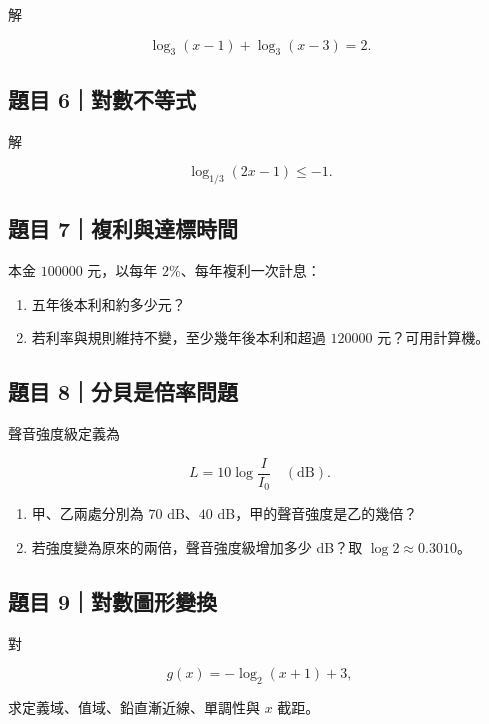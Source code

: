 \documentclass[11pt,a4paper]{article}
\providecommand{\tightlist}{%
  \setlength{\itemsep}{0pt}\setlength{\parskip}{0pt}}
\begin{document}
解

\[
\log_3(x-1)+\log_3(x-3)=2.
\]

\subsection{題目 6｜對數不等式}\label{ux984cux76ee-6ux5c0dux6578ux4e0dux7b49ux5f0f}

解

\[
\log_{1/3}(2x-1)\le-1.
\]

\subsection{題目 7｜複利與達標時間}\label{ux984cux76ee-7ux8907ux5229ux8207ux9054ux6a19ux6642ux9593}

本金 \(100000\) 元，以每年 \(2\%\)、每年複利一次計息：

\begin{enumerate}
\def\labelenumi{\arabic{enumi}.}
\tightlist
\item
  五年後本利和約多少元？
\item
  若利率與規則維持不變，至少幾年後本利和超過 \(120000\) 元？可用計算機。
\end{enumerate}

\subsection{題目 8｜分貝是倍率問題}\label{ux984cux76ee-8ux5206ux8c9dux662fux500dux7387ux554fux984c}

聲音強度級定義為

\[
L=10\log\frac{I}{I_0}\quad(\mathrm{dB}).
\]

\begin{enumerate}
\def\labelenumi{\arabic{enumi}.}
\tightlist
\item
  甲、乙兩處分別為 \(70\) dB、\(40\) dB，甲的聲音強度是乙的幾倍？
\item
  若強度變為原來的兩倍，聲音強度級增加多少 dB？取 \(\log2\approx0.3010\)。
\end{enumerate}

\subsection{題目 9｜對數圖形變換}\label{ux984cux76ee-9ux5c0dux6578ux5716ux5f62ux8b8aux63db}

對

\[
g(x)=-\log_2(x+1)+3,
\]

求定義域、值域、鉛直漸近線、單調性與 \(x\) 截距。
\end{document}
